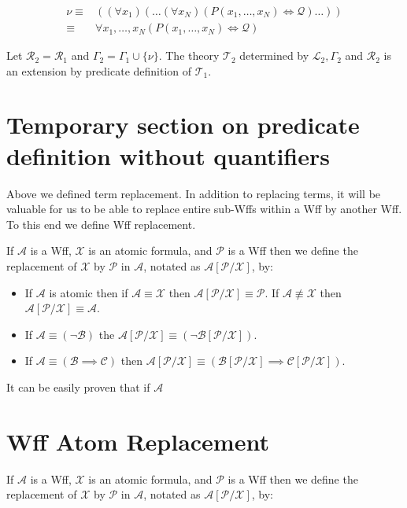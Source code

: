 \documentclass[12pt]{article}
\theoremstyle{break}
\theoremstyle{break}
\theoremstyle{break}
\theoremstyle{break}
\newcommand{\mc}[1]{\mathcal{#1}}
\begin{document}
\begin{align*}
\nu \equiv& ((\forall x_1) (\ldots (\forall x_N) (P(x_1, \ldots, x_N) \iff \mc{Q}) \ldots ))\\
\equiv& \forall x_1,\ldots,x_N (P(x_1, \ldots, x_N) \iff \mc{Q})
\end{align*}

Let $\mc{R}_2 = \mc{R}_1$ and $\Gamma_2 = \Gamma_1 \cup \{\nu\}$.
The theory $\mc{T}_2$ determined by $\mc{L}_2, \Gamma_2$ and $\mc{R}_2$ is an extension by predicate definition of $\mc{T}_1$.

\section{Temporary section on predicate definition without quantifiers}

Above we defined term replacement.
In addition to replacing terms, it will be valuable for us to be able to replace entire sub-Wffs within a Wff by another Wff.
To this end we define Wff replacement.


If $\mc{A}$ is a Wff, $\mc{X}$ is an atomic formula, and $\mc{P}$ is a Wff then we define the replacement of $\mc{X}$ by $\mc{P}$ in $\mc{A}$, notated as $\mc{A}[\mc{P}/\mc{X}]$, by:

\hrulefill
\begin{itemize}
\item{If $\mc{A}$ is atomic then if $\mc{A}\equiv \mc{X}$ then $\mc{A}[\mc{P}/\mc{X}] \equiv \mc{P}$. If $\mc{A}\not\equiv \mc{X}$ then $\mc{A}[\mc{P}/\mc{X}] \equiv \mc{A}$.}
\item{If $\mc{A} \equiv (\lnot \mc{B})$ the $\mc{A}[\mc{P}/\mc{X}] \equiv (\lnot \mc{B}[\mc{P}/\mc{X}])$.}
\item{If $\mc{A} \equiv (\mc{B} \implies \mc{C})$ then $\mc{A}[\mc{P}/\mc{X}] \equiv (\mc{B}[\mc{P}/\mc{X}] \implies \mc{C}[\mc{P}/\mc{X}])$.}
\end{itemize}
\hrulefill

It can be easily proven that if $\mc{A}$

\section{Wff Atom Replacement}

If $\mc{A}$ is a Wff, $\mc{X}$ is an atomic formula, and $\mc{P}$ is a Wff then we define the replacement of $\mc{X}$ by $\mc{P}$ in $\mc{A}$, notated as $\mc{A}[\mc{P}/\mc{X}]$, by:
\end{document}
